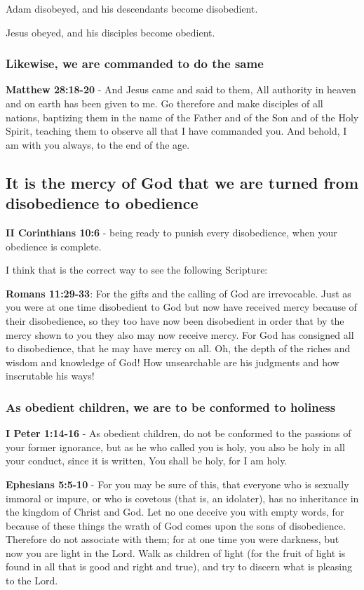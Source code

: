 \documentclass[11pt]{article}
\begin{document}
Adam disobeyed, and his descendants become disobedient.

Jesus obeyed, and his disciples become obedient.

\subsubsection{Likewise, we are commanded to do the same}
\label{sec:org5240cac}
\textbf{Matthew 28:18-20} - And Jesus came and said to them, All authority in heaven and on earth has been given to me. Go therefore and make disciples of all nations, baptizing them in the name of the Father and of the Son and of the Holy Spirit, teaching them to observe all that I have commanded you. And behold, I am with you always, to the end of the age.

\subsection{It is the mercy of God that we are turned from disobedience to obedience}
\label{sec:orgea73ca0}
\textbf{II Corinthians 10:6} - being ready to punish every disobedience, when your obedience is complete.

I think that is the correct way to see the following Scripture:

\textbf{Romans 11:29-33}: For the gifts and the calling of God are irrevocable. Just as you were at one time disobedient to God but now have received mercy because of their disobedience, so they too have now been disobedient in order that by the mercy shown to you they also may now receive mercy. For God has consigned all to disobedience, that he may have mercy on all. Oh, the depth of the riches and wisdom and knowledge of God! How unsearchable are his judgments and how inscrutable his ways!

\subsubsection{As obedient children, we are to be conformed to holiness}
\label{sec:org8b1657e}
\textbf{I Peter 1:14-16} - As obedient children, do not be conformed to the passions of your former ignorance, but as he who called you is holy, you also be holy in all your conduct, since it is written, You shall be holy, for I am holy.

\textbf{Ephesians 5:5-10} - For you may be sure of this, that everyone who is sexually immoral or impure, or who is covetous (that is, an idolater), has no inheritance in the kingdom of Christ and God. Let no one deceive you with empty words, for because of these things the wrath of God comes upon the sons of disobedience. Therefore do not associate with them; for at one time you were darkness, but now you are light in the Lord. Walk as children of light (for the fruit of light is found in all that is good and right and true), and try to discern what is pleasing to the Lord.
\end{document}
